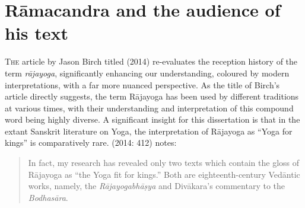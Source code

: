 \section{Rāmacandra and the audience of his text}
\label{ytb-audience}

\lettrine[lines=2, lhang=0.2, loversize=0.25]{T}{he} article by Jason Birch titled  (2014) re-evaluates the reception history of the term \textit{rājayoga}, significantly enhancing our understanding, coloured by modern interpretations, with a far more nuanced perspective. As the title of Birch's article directly suggests, the term Rājayoga has been used by different traditions at various times, with their understanding and interpretation of this compound word being highly diverse. A significant insight for this dissertation is that in the extant Sanskrit literature on Yoga, the interpretation of Rājayoga as ``Yoga for kings'' is comparatively rare. \citeauthor{birch2014} (2014: 412) notes:

\begin{quote} In fact, my research has revealed only two texts which contain the gloss of Rājayoga as ``the Yoga fit for kings.'' Both are eighteenth-century Vedāntic works, namely, the \textit{Rājayogabhāṣya} and Divākara's commentary to the \textit{Bodhasāra}. \end{quote}

